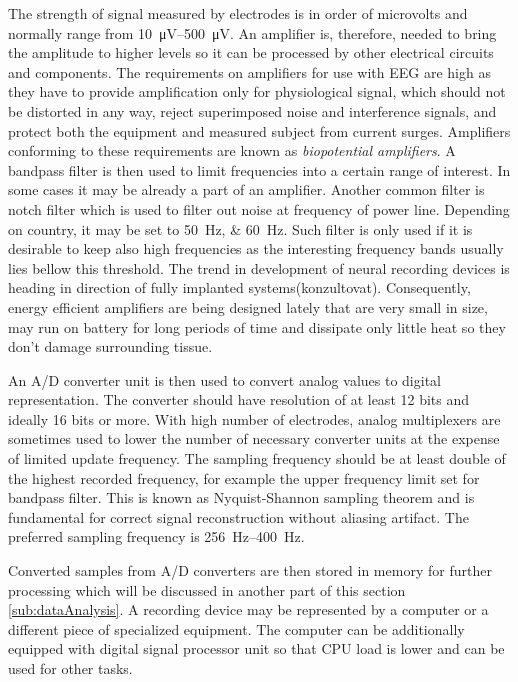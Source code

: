 The strength of signal measured by electrodes is in order of microvolts and
normally range from \SIrange{10}{500}{\uV}. \cite{neuralAmp} An amplifier is,
therefore, needed to bring the amplitude to higher levels so it can be processed
by other electrical circuits and components. The requirements on amplifiers for
use with EEG are high as they have to provide amplification only for physiological
signal, which should not be distorted in any way, reject superimposed noise and
interference signals, and protect both the equipment and measured subject from
current surges. Amplifiers conforming to these requirements are known as
\emph{biopotential amplifiers}. \cite{biopotAmp}
A bandpass filter is then used to limit frequencies into a certain range of
interest. In some cases it may be already a part of an amplifier.
Another common filter is notch filter which is used to filter out noise
at frequency of power line. Depending on country, it may be set to
\SIlist[list-units = single, list-pair-separator = { or }]{50;60}{\Hz}.
\cite{deltaCompNREM} Such filter is only used if it is desirable to keep also
high frequencies as the interesting frequency bands usually lies bellow this
threshold.
The trend in development of neural recording devices is heading in direction of
fully implanted systems(konzultovat). Consequently, energy efficient amplifiers
are being designed lately that are very small in size, may run on battery for
long periods of time and dissipate only little heat so they don't damage
surrounding tissue. \cite{neuralAmp}

An A/D converter unit is then used to convert analog values to digital
representation. The converter should have resolution of at least 12 bits and
ideally 16 bits or more. With high number of electrodes, analog multiplexers are
sometimes used to lower the number of necessary converter units at the expense
of limited update frequency. The sampling frequency should be at least double of
the highest recorded frequency, for example the upper frequency limit set for
bandpass filter. This is known as Nyquist-Shannon sampling theorem and is
fundamental for correct signal reconstruction without aliasing artifact. The
preferred sampling frequency is \SIrange{256}{400}{\Hz}. \cite{guidDigEEG}

Converted samples from A/D converters are then stored in memory for further
processing which will be discussed in another part of this section
\ref{sub:dataAnalysis}. A recording device may be represented by a computer or a
different piece of specialized equipment. The computer can be additionally
equipped with digital signal processor unit so that CPU load is lower and can be
used for other tasks.

